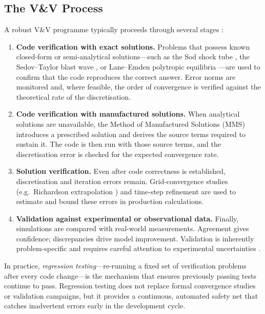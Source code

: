 \documentclass[11pt,a4paper]{article}
\begin{document}
\subsection{The V\&V Process}

A robust V\&V programme typically proceeds through several stages
\cite{oberkampf2010}:

\begin{enumerate}
  \item \textbf{Code verification with exact solutions.}
    Problems that possess known closed-form or semi-analytical solutions---such
    as the Sod shock tube \cite{sod1978}, the Sedov--Taylor blast wave
    \cite{sedov1959,taylor1950}, or Lane--Emden polytropic equilibria
    \cite{chandrasekhar1939}---are used to confirm that the code reproduces the
    correct answer.  Error norms are monitored and, where feasible, the order of
    convergence is verified against the theoretical rate of the discretisation.

  \item \textbf{Code verification with manufactured solutions.}
    When analytical solutions are unavailable, the Method of Manufactured
    Solutions (MMS) \cite{roache2002,salari2000} introduces a prescribed
    solution and derives the source terms required to sustain it.  The code is
    then run with those source terms, and the discretisation error is checked
    for the expected convergence rate.

  \item \textbf{Solution verification.}
    Even after code correctness is established, discretisation and iteration
    errors remain.  Grid-convergence studies (e.g.\ Richardson extrapolation
    \cite{richardson1911,roache1998}) and time-step refinement are used to
    estimate and bound these errors in production calculations.

  \item \textbf{Validation against experimental or observational data.}
    Finally, simulations are compared with real-world measurements.  Agreement
    gives confidence; discrepancies drive model improvement.  Validation is
    inherently problem-specific and requires careful attention to experimental
    uncertainties \cite{oberkampf2010}.
\end{enumerate}

In practice, \emph{regression testing}---re-running a fixed set of verification
problems after every code change---is the mechanism that ensures
previously passing tests continue to pass.  Regression testing does not replace
formal convergence studies or validation campaigns, but it provides a
continuous, automated safety net that catches inadvertent errors early in the
development cycle.
\end{document}
